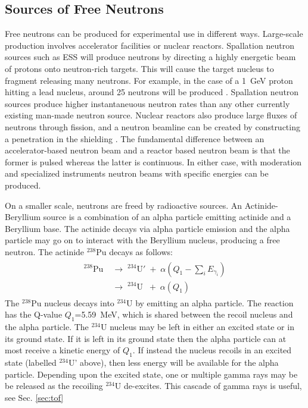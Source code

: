 \documentclass[main.tex]{subfiles}
\begin{document}
\subsection{Sources of Free Neutrons}
Free neutrons can be produced for experimental use in different ways. Large-scale production involves accelerator facilities or nuclear reactors. Spallation neutron sources such as ESS will produce neutrons by directing a highly energetic beam of protons onto neutron-rich targets. This will cause the target nucleus to fragment releasing many neutrons. 
For example, in the case of a \SI{1}{\GeV} proton hitting a lead nucleus, around 25 neutrons will be produced \cite{Tavernier}. Spallation neutron sources produce higher instantaneuous neutron rates than any other currently existing man-made neutron source.
Nuclear reactors also produce large fluxes of neutrons through fission, and a neutron beamline can be created by constructing a penetration in the shielding  \cite{Krane}. The fundamental difference between an accelerator-based neutron beam and a reactor based neutron beam is that the former is pulsed whereas the latter is continuous. In either case, with moderation and specialized instruments neutron beams with specific energies can be produced.

On a smaller scale, neutrons are freed by radioactive sources. An Actinide-Beryllium source is a combination of an alpha particle emitting actinide and a Beryllium base. The actinide decays via alpha particle emission and the alpha particle may go on to interact with the Beryllium nucleus, producing a free neutron. The actinide $^\textrm{238}$Pu decays as follows:
\begin{align}
	\begin{split}	
		^\textrm{238}\textrm{Pu}\;&\rightarrow\;^{\textrm{234}}\textrm{U}'\;+\;\alpha\left(Q_1-\textstyle\sum_i E_{\gamma_i}\right)\\
		&\rightarrow\;^{\textrm{234}}\textrm{U}\;\;+\;\alpha(Q_1)
	\label{eq:actinide}
	\end{split}
\end{align}
The $^\textrm{238}$Pu nucleus decays into $^\textrm{234}$U by emitting an alpha particle. The reaction has the Q-value $Q_1$=\SI{5.59}{\MeV}, which is shared between the recoil nucleus and the alpha particle. The $^\textrm{234}$U nucleus may be left in either an excited state or in its ground state. If it is left in its ground state then the alpha particle can at most receive a kinetic energy of $Q_1$. If instead the nucleus recoils in an excited state (labelled $^\textrm{234}$U' above), then less energy will be available for the alpha particle.
Depending upon the excited state, one or multiple gamma rays may be be released as the recoiling $^\textrm{234}$U de-excites. This cascade of gamma rays is useful, see Sec. \ref{sec:tof}
\end{document}
